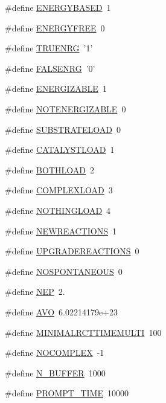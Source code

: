 \begin{DoxyCompactItemize}
\#define \hyperlink{a00051_aca2c6e3c97c1e9728693b5c3c8c7f229}{E\+N\+E\+R\+G\+Y\+B\+A\+S\+E\+D}~1
\item 
\#define \hyperlink{a00051_a3efd65798c1856deacf187790b3f9ef5}{E\+N\+E\+R\+G\+Y\+F\+R\+E\+E}~0
\item 
\#define \hyperlink{a00051_a903e07285c96e6fbb9aa3577ddd1f327}{T\+R\+U\+E\+N\+R\+G}~'1'
\item 
\#define \hyperlink{a00051_ada187b73f4b4a504680ead4f86785021}{F\+A\+L\+S\+E\+N\+R\+G}~'0'
\item 
\#define \hyperlink{a00051_a2ce381beee4efd263052e93f9cbbfc77}{E\+N\+E\+R\+G\+I\+Z\+A\+B\+L\+E}~1
\item 
\#define \hyperlink{a00051_a04e076b71093a6dc76f99298d9cfeb9e}{N\+O\+T\+E\+N\+E\+R\+G\+I\+Z\+A\+B\+L\+E}~0
\item 
\#define \hyperlink{a00051_a5a83a3ca25e31afb2d58aa40c8b1fbbb}{S\+U\+B\+S\+T\+R\+A\+T\+E\+L\+O\+A\+D}~0
\item 
\#define \hyperlink{a00051_a7e521c899f69e37df3501fd0e652c517}{C\+A\+T\+A\+L\+Y\+S\+T\+L\+O\+A\+D}~1
\item 
\#define \hyperlink{a00051_afb6d1105a81463fbadceff0217332f68}{B\+O\+T\+H\+L\+O\+A\+D}~2
\item 
\#define \hyperlink{a00051_a7eb138e043eb9ec6d717c6178724bbaf}{C\+O\+M\+P\+L\+E\+X\+L\+O\+A\+D}~3
\item 
\#define \hyperlink{a00051_a15e77522039bb4bb52000b65773c83cf}{N\+O\+T\+H\+I\+N\+G\+L\+O\+A\+D}~4
\item 
\#define \hyperlink{a00051_afb2a947dfb1847f71649f82bc1bf0292}{N\+E\+W\+R\+E\+A\+C\+T\+I\+O\+N\+S}~1
\item 
\#define \hyperlink{a00051_a5119e853077046684673dad15af9199f}{U\+P\+G\+R\+A\+D\+E\+R\+E\+A\+C\+T\+I\+O\+N\+S}~0
\item 
\#define \hyperlink{a00051_a9ea25e0eb039e29accaed6cb99632deb}{N\+O\+S\+P\+O\+N\+T\+A\+N\+E\+O\+U\+S}~0
\item 
\#define \hyperlink{a00051_a029d801cdb598a397cb99ea968a64dc2}{N\+E\+P}~2.
\item 
\#define \hyperlink{a00051_a174754c04acfba9e1f66ba249e68643a}{A\+V\+O}~6.\+02214179e+23
\item 
\#define \hyperlink{a00051_aa7d0d45ef785688de1c634290ceb02e7}{M\+I\+N\+I\+M\+A\+L\+R\+C\+T\+T\+I\+M\+E\+M\+U\+L\+T\+I}~100
\item 
\#define \hyperlink{a00051_a8da7044a9c837d5544508f9fa400ea52}{N\+O\+C\+O\+M\+P\+L\+E\+X}~-\/1
\item 
\#define \hyperlink{a00051_a2608b9496c2fae19afe620cc801c1967}{N\+\_\+\+B\+U\+F\+F\+E\+R}~1000
\item 
\#define \hyperlink{a00051_a6e32fce4415266c0aecd671afba386d5}{P\+R\+O\+M\+P\+T\+\_\+\+T\+I\+M\+E}~10000
\end{DoxyCompactItemize}
